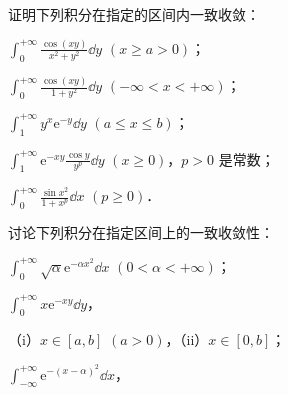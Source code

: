 \begin{xiti}
\item 证明下列积分在指定的区间内一致收敛：
\begin{ziti}
\item $\displaystyle\int_{0}^{+\infty}\frac{\cos(xy)}{x^{2}+y^{2}}\dd y$ $(x\geqslant a>0)$；
\item $\displaystyle\int_{0}^{+\infty}\frac{\cos(xy)}{1+y^{2}}\dd y$ $(-\infty<x<+\infty)$；
\item $\displaystyle\int_{1}^{+\infty}y^{x}\mathrm{e}^{-y}\dd y$ $(a\leqslant x\leqslant b)$；
\item $\displaystyle\int_{1}^{+\infty}\mathrm{e}^{-xy}\frac{\cos y}{y^{p}}\dd y$ $(x\geqslant 0)$，$p>0$ 是常数；
\item $\displaystyle\int_{0}^{+\infty}\frac{\sin x^{2}}{1+x^{p}}\dd x$ $(p\geqslant 0)$．
\end{ziti}
\item 讨论下列积分在指定区间上的一致收敛性：
\begin{ziti}
\item $\displaystyle\int_{0}^{+\infty}\sqrt{\alpha}\mathrm{e}^{-\alpha x^{2}}\dd x$ $(0<\alpha<+\infty)$；
\item $\displaystyle\int_{0}^{+\infty}x\mathrm{e}^{-xy}\dd y$，

（i）$x\in[a,b]$ $(a>0)$，（ii）$x\in[0,b]$；
\item $\displaystyle\int_{-\infty}^{+\infty}\mathrm{e}^{-(x-\alpha)^{2}}\dd x$，


\end{ziti}
\end{xiti}
